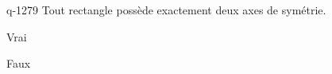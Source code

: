 \begin{truefalse}{q-1279}
Tout rectangle possède exactement deux axes de symétrie.
\item Vrai
\item* Faux
\end{truefalse}

